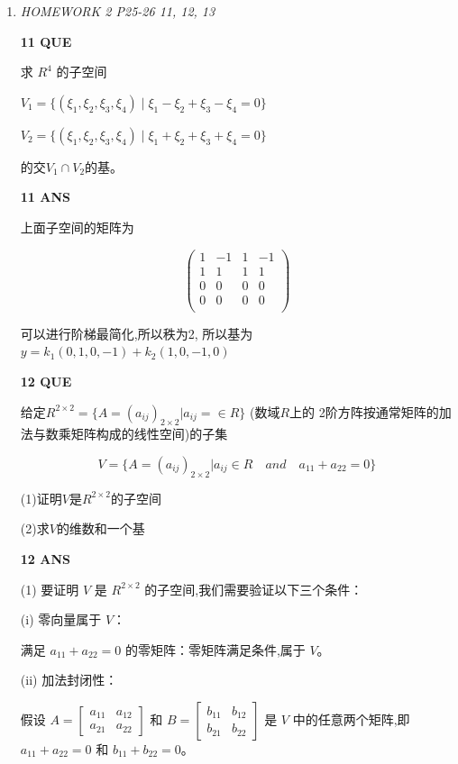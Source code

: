 \documentclass[11pt,letterpaper]{ctexart}
\begin{document}
\begin{enumerate}
	{所以最终结果为$a = k(1, 1, 1, -1)^T $\qquad  k为不为0的常数}


\item \textit{HOMEWORK 2 {P25-26 11, 12, 13}}%

\textbf{11 QUE}
\bigskip

求 $R^4$ 的子空间

$V_1 = \{(\xi_1, \xi_2, \xi_3, \xi_4) \mid \xi_1 - \xi_2 + \xi_3 - \xi_4 = 0\}$ 

$V_2 = \{(\xi_1, \xi_2, \xi_3, \xi_4) \mid \xi_1 + \xi_2 + \xi_3 + \xi_4 = 0\}$

的交$V_1 \cap V_2$的基。


\textbf{11 ANS}
\bigskip

上面子空间的矩阵为

\[\begin{pmatrix}
	1 & -1 & 1 & -1 \\
	1 & 1 & 1 & 1 \\
	0 & 0 & 0 & 0 \\
	0 & 0 & 0 & 0 \\
\end{pmatrix}\]

可以进行阶梯最简化,所以秩为2, 所以基为 $y = k_1(0, 1, 0, -1) + k_2(1, 0, -1, 0)$


\textbf{12 QUE}
\bigskip

给定$R^{2\times2} = \{A = (a_{ij})_{2\times2} | a_{ij}= \in R \}$ (数域$R$上的
2阶方阵按通常矩阵的加法与数乘矩阵构成的线性空间)的子集

\[V = \{A = (a_{ij})_{2\times2} | a_{ij} \in R \quad and \quad  a_{11} + a_{22} = 0 \} \]

(1)证明$V$是$R^{2\times2}$的子空间

(2)求$V$的维数和一个基



\textbf{12 ANS}
\bigskip

(1) 要证明 $V$ 是 $R^{2\times2}$ 的子空间,我们需要验证以下三个条件：

(i) 零向量属于 $V$：

满足 $a_{11} + a_{22} = 0$ 的零矩阵：零矩阵满足条件,属于 $V$。

(ii) 加法封闭性：

假设 $A = \begin{bmatrix} a_{11} & a_{12} \\ a_{21} & a_{22} \end{bmatrix}$ 和 $B = \begin{bmatrix} b_{11} & b_{12} \\ b_{21} & b_{22} \end{bmatrix}$ 是 $V$ 中的任意两个矩阵,即 $a_{11} + a_{22} = 0$ 和 $b_{11} + b_{22} = 0$。


\end{enumerate}
\end{document}
